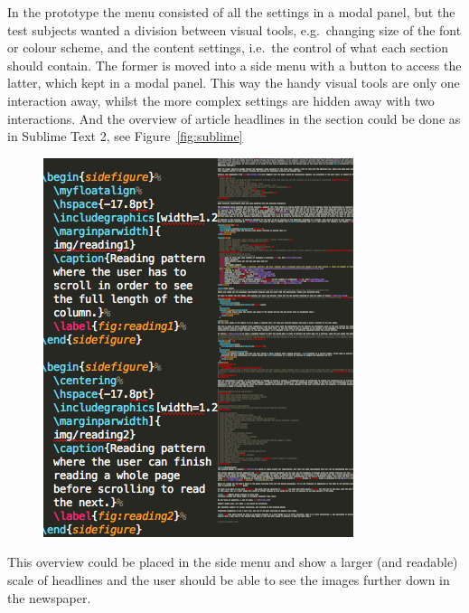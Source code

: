 In the prototype the menu consisted of all the settings in a modal panel, but the test subjects wanted a division between visual tools, e.g.\ changing size of the font or colour scheme, and the content settings, i.e.\ the control of what each section should contain. The former is moved into a side menu with a button to access the latter, which kept in a modal panel. This way the handy visual tools are only one interaction away, whilst the more complex settings are hidden away with two interactions. And the overview of article headlines in the section could be done as in Sublime Text 2, see Figure~\ref{fig:sublime}
\begin{figure}[h!tp]
	\myfloatalign
	\includegraphics[width=.5\textwidth]{img/sublime}
\end{figure}

This overview could be placed in the side menu and show a larger (and readable) scale of headlines and the user should be able to see the images further down in the newspaper.

